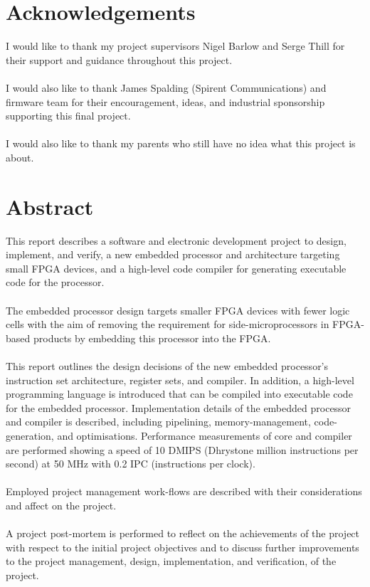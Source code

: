 \documentclass[11pt,a4paper]{report}
\begin{document}
\chapter*{Acknowledgements}
I would like to thank my project supervisors Nigel Barlow and Serge Thill for their support and guidance throughout this project. 
\\\\
I would also like to thank James Spalding (Spirent Communications) and firmware team for their encouragement, ideas, and industrial sponsorship supporting this final project.
\\\\
I would also like to thank my parents who still have no idea what this project is about.

\newpage
\chapter*{Abstract}
\startcontents[chapters]
\noindent
This report describes a software and electronic development project to design, implement, and verify, a new embedded processor and architecture targeting small FPGA devices, and a high-level code compiler for generating executable code for the processor.
\\\\
The embedded processor design targets smaller FPGA devices with fewer logic cells with the aim of removing the requirement for side-microprocessors in FPGA-based products by embedding this processor into the FPGA.
\\\\
This report outlines the design decisions of the new embedded processor's instruction set architecture, register sets, and compiler. In addition, a high-level programming language is introduced that can be compiled into executable code for the embedded processor. Implementation details of the embedded processor and compiler is described, including pipelining, memory-management, code-generation, and optimisations. Performance measurements of core and compiler are performed showing a speed of 10 DMIPS (Dhrystone million instructions per second) at 50 MHz with 0.2 IPC (instructions per clock).
\\\\
Employed project management work-flows are described with their considerations and affect on the project. 
\\\\
A project post-mortem is performed to reflect on the achievements of the project with respect to the initial project objectives and to discuss further improvements to the project management, design, implementation, and verification, of the project.
\end{document}
